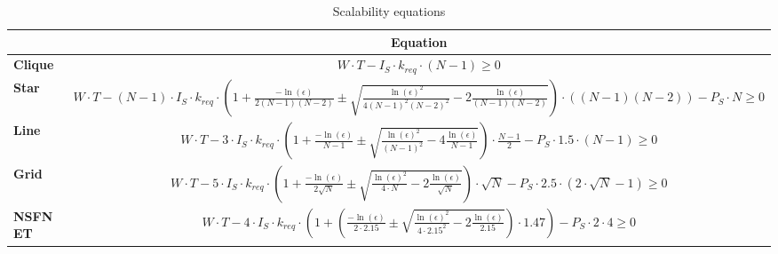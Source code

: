 \begin{table}[]
\centering
\begin{tabular}{l|l|}
\cline{2-2}
                             & \multicolumn{1}{c|}{{\bf Equation}} \\ \hline
\multicolumn{1}{|l|}{\textbf{Clique}} & \multicolumn{1}{c|}{$W \cdot T - I_S \cdot k_{req} \cdot (N-1) \geq 0$}            \\ \hline
\multicolumn{1}{|l|}{{\color{blue}\textbf{Star}}}   & \multicolumn{1}{c|}{{\color{blue}$W \cdot T - (N-1) \cdot I_S \cdot k_{req} \cdot ( 1 + \frac{-\ln(\epsilon)}{2(N-1)(N-2)} \pm \sqrt{\frac{\ln(\epsilon)^2}{4(N-1)^2(N-2)^2} - 2\frac{\ln(\epsilon)}{(N-1)(N-2)}} )\cdot((N-1)(N-2)) - P_S \cdot N \geq 0$}}      \\ \hline
\multicolumn{1}{|l|}{\textbf{Line}}   & \multicolumn{1}{c|}{$W \cdot T - 3 \cdot I_S \cdot k_{req} \cdot (1 + \frac{-\ln(\epsilon)}{N-1} \pm \sqrt{\frac{\ln(\epsilon)^2}{(N-1)^2} - 4\frac{\ln(\epsilon)}{N-1}} ) \cdot \frac{N-1}{2} - P_S \cdot 1.5 \cdot (N-1) \geq 0$}       \\ \hline
\multicolumn{1}{|l|}{\textbf{Grid}}   & \multicolumn{1}{c|}{$W \cdot T - 5 \cdot I_S \cdot k_{req} \cdot (1 + \frac{-\ln(\epsilon)}{2\sqrt{N}} \pm \sqrt{\frac{\ln(\epsilon)^2}{4 \cdot N} - 2\frac{\ln(\epsilon)}{\sqrt{N}}} ) \cdot \sqrt{N} - P_S \cdot 2.5 \cdot (2 \cdot \sqrt{N} - 1) \geq 0$}      \\ \hline
\multicolumn{1}{|l|}{{\color{blue}\textbf{NSFNET}}}   & \multicolumn{1}{c|}{{\color{blue}$W \cdot T - 4 \cdot I_S \cdot k_{req} \cdot ( 1 + (\frac{-\ln(\epsilon)}{2 \cdot 2.15} \pm \sqrt{\frac{\ln(\epsilon)^2}{4 \cdot 2.15^2} - 2\frac{\ln(\epsilon)}{2.15}} ) \cdot 1.47) - P_S \cdot 2 \cdot 4 \geq 0$}}      \\ \hline
\end{tabular}
\vspace{1mm}
\caption{Scalability equations}
\label{table:scal_eqs}
    \vspace{-6mm}
\end{table}

